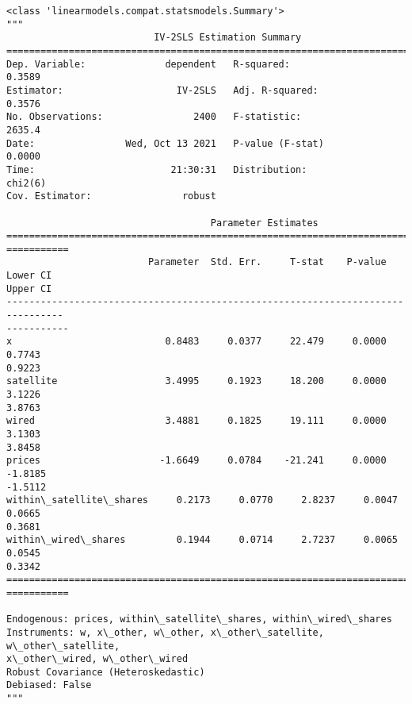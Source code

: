             \begin{tcolorbox}[breakable, size=fbox, boxrule=.5pt, pad at break*=1mm, opacityfill=0]
\begin{Verbatim}[commandchars=\\\{\}]
<class 'linearmodels.compat.statsmodels.Summary'>
"""
                          IV-2SLS Estimation Summary
==============================================================================
Dep. Variable:              dependent   R-squared:                      0.3589
Estimator:                    IV-2SLS   Adj. R-squared:                 0.3576
No. Observations:                2400   F-statistic:                    2635.4
Date:                Wed, Oct 13 2021   P-value (F-stat)                0.0000
Time:                        21:30:31   Distribution:                  chi2(6)
Cov. Estimator:                robust

                                    Parameter Estimates
================================================================================
===========
                         Parameter  Std. Err.     T-stat    P-value    Lower CI
Upper CI
--------------------------------------------------------------------------------
-----------
x                           0.8483     0.0377     22.479     0.0000      0.7743
0.9223
satellite                   3.4995     0.1923     18.200     0.0000      3.1226
3.8763
wired                       3.4881     0.1825     19.111     0.0000      3.1303
3.8458
prices                     -1.6649     0.0784    -21.241     0.0000     -1.8185
-1.5112
within\_satellite\_shares     0.2173     0.0770     2.8237     0.0047      0.0665
0.3681
within\_wired\_shares         0.1944     0.0714     2.7237     0.0065      0.0545
0.3342
================================================================================
===========

Endogenous: prices, within\_satellite\_shares, within\_wired\_shares
Instruments: w, x\_other, w\_other, x\_other\_satellite, w\_other\_satellite,
x\_other\_wired, w\_other\_wired
Robust Covariance (Heteroskedastic)
Debiased: False
"""
\end{Verbatim}
\end{tcolorbox}

